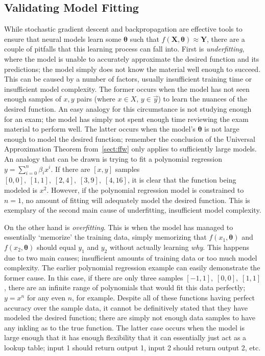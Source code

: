 \subsection{Validating Model Fitting}
While stochastic gradient descent and backpropagation are effective tools to ensure that neural models learn some $\mathbf{\theta}$ such
that $f(\mathbf{X}, \mathbf{\theta})\approx \mathbf{Y}$, there are a couple of pitfalls that this learning process can fall into. First is
\textit{underfitting}, where the model is unable to accurately approximate the desired function and its predictions;
the model simply does not know the material well enough to succeed. This can be caused by a number of factors, usually
insufficient training time or insufficient model
complexity. The former occurs when the model has not seen enough samples of $x, y$ pairs (where $x \in X$, $y \in \vec{y}$)
to learn the nuances of the desired function. An easy analogy for this circumstance is not studying enough for an
exam; the model has simply not spent enough time reviewing the exam material to perform well. The latter occurs when
the model's $\mathbf{\theta}$ is not large enough to model the desired function; remember the conclusion of the Universal Approximation
Theorem from~\ref{sect:ffw} only applies to sufficiently large models. An analogy that can be drawn is trying to fit a polynomial regression
$y = \sum_{i=0}^{n} \beta_i x^i$. If there are $[x, y]$ samples $[0, 0],\;[1, 1],\;[2, 4],\;[3, 9],\;[4, 16]$, it is clear that
the function being modeled is $x^2$. However, if the polynomial regression model is constrained to $n=1$, no amount
of fitting will adequately model the desired function. This is exemplary of the second main cause of underfitting, insufficient
model complexity.

On the other hand is \textit{overfitting}. This is when the model has managed to essentially `memorize'
the training data, simply memorizing that $f(x_1, \mathbf{\theta})$ and $f(x_2, \mathbf{\theta})$ should equal $y_1$ and $y_2$ without actually learning
\textit{why}. This happens due to two main causes; insufficient amounts of training data or too much model complexity. The
earlier polynomial regression example can easily demonstrate the former cause. In this case, if there are only three samples
$[-1, 1],\;[0, 0],\;[1, 1]$, there are an infinite range of polynomials that would fit this data perfectly;
$y=x^n$ for any even $n$, for example. Despite all of these functions having perfect accuracy over the sample data,
it cannot be definitively stated that they have modeled the desired function; there are simply not enough data samples to have
any inkling as to the true function. The latter case occurs when the model is large enough that it has enough
flexibility that it can essentially just act as a lookup table; input 1 should return output 1, input 2 should return output 2,
etc.

